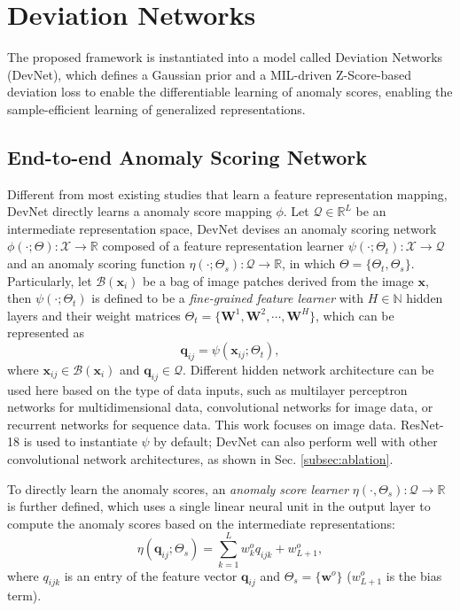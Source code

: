\documentclass[10pt,journal,compsoc]{IEEEtran}
\begin{document}
\section{Deviation Networks}

The proposed framework is instantiated into a model called Deviation Networks (DevNet), which defines a Gaussian prior and a MIL-driven Z-Score-based deviation loss to enable the differentiable learning of anomaly scores, enabling the sample-efficient learning of generalized representations.

\subsection{End-to-end Anomaly Scoring Network}\label{subsec:score_network}
Different from most existing studies that learn a feature representation mapping, DevNet directly learns a anomaly score mapping $\phi$. Let $\mathcal{Q} \in \mathbb{R}^{L}$ be an intermediate representation space, DevNet devises an anomaly scoring network $\phi(\cdot; \Theta):\mathcal{X} \rightarrow \mathbb{R}$ composed of a feature representation learner $\psi(\cdot; \Theta_{t}): \mathcal{X} \rightarrow \mathcal{Q}$ and an anomaly scoring function $\eta(\cdot; \Theta_{s}): \mathcal{Q} \rightarrow \mathbb{R}$, in which $\Theta=\{\Theta_{t}, \Theta_{s}\}$. Particularly, let $\mathcal{B}(\mathbf{x}_{i})$ be a bag of image patches derived from the image $\mathbf{x}$, then $\psi(\cdot; \Theta_{t})$ is defined to be a \textit{fine-grained feature learner} with $H \in \mathbb{N}$ hidden layers and their weight matrices $\Theta_{t}=\{\mathbf{W}^{1}, \mathbf{W}^{2}, \cdots, \mathbf{W}^{H}\}$, which can be represented as
\begin{equation}
    \mathbf{q}_{ij} = \psi(\mathbf{x}_{ij}; \Theta_{t}),
\end{equation}
where $\mathbf{x}_{ij} \in \mathcal{B}(\mathbf{x}_{i})$ and $\mathbf{q}_{ij} \in \mathcal{Q}$. Different hidden network architecture can be used here based on the type of data inputs, such as multilayer perceptron networks for multidimensional data, convolutional networks for image data, or recurrent networks for sequence data. This work focuses on image data. ResNet-18 \cite{he2016deep} is used to instantiate $\psi$ by default; DevNet can also perform well with other convolutional network architectures, as shown in Sec. \ref{subsec:ablation}.

To directly learn the anomaly scores, an \textit{anomaly score learner} $\eta(\cdot, \Theta_{s}): \mathcal{Q} \rightarrow \mathbb{R}$ is further defined, which uses a single linear neural unit in the output layer to compute the anomaly scores based on the intermediate representations:
\begin{equation}
    \eta(\mathbf{q}_{ij};\Theta_{s}) = \sum_{k=1}^{L}w^{o}_{k} q_{ijk} + w^{o}_{L+1},
\end{equation}
where $q_{ijk}$ is an entry of the feature vector $\mathbf{q}_{ij}$ and $\Theta_{s} = \{\mathbf{w}^{o}\} $ ($w^{o}_{L+1}$ is the bias term).
\end{document}
